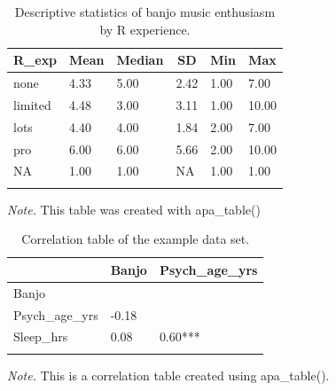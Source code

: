 \documentclass[english,man]{apa6}
\theoremstyle{definition}
\theoremstyle{definition}
\theoremstyle{definition}
\theoremstyle{remark}
\begin{document}
\begin{table}[tbp]
\begin{center}
\begin{threeparttable}
\caption{\label{tab:Banjo-by-experience}Descriptive statistics of banjo music enthusiasm by R experience.}
\begin{tabular}{llllll}
\toprule
R\_exp & \multicolumn{1}{c}{Mean} & \multicolumn{1}{c}{Median} & \multicolumn{1}{c}{SD} & \multicolumn{1}{c}{Min} & \multicolumn{1}{c}{Max}\\
\midrule
none & 4.33 & 5.00 & 2.42 & 1.00 & 7.00\\
limited & 4.48 & 3.00 & 3.11 & 1.00 & 10.00\\
lots & 4.40 & 4.00 & 1.84 & 2.00 & 7.00\\
pro & 6.00 & 6.00 & 5.66 & 2.00 & 10.00\\
NA & 1.00 & 1.00 & NA & 1.00 & 1.00\\
\bottomrule
\addlinespace
\end{tabular}
\begin{tablenotes}[para]
\textit{Note.} This table was created with apa\_table()
\end{tablenotes}
\end{threeparttable}
\end{center}
\end{table}

\begin{table}[tbp]
\begin{center}
\begin{threeparttable}
\caption{\label{tab:apa-corr-table}Correlation table of the example data set.}
\begin{tabular}{lll}
\toprule
 & \multicolumn{1}{c}{Banjo} & \multicolumn{1}{c}{Psych\_age\_yrs}\\
\midrule
Banjo &  & \\
Psych\_age\_yrs & -0.18 & \\
Sleep\_hrs & 0.08 & 0.60***\\
\bottomrule
\addlinespace
\end{tabular}
\begin{tablenotes}[para]
\textit{Note.} This is a correlation table created using apa\_table().
\end{tablenotes}
\end{threeparttable}
\end{center}
\end{table}
\end{document}
